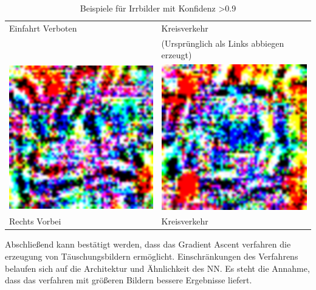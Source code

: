 \begin{table}
\begin{tabular}{p{4.4cm}p{4.4cm}}
	Einfahrt Verboten & Kreisverkehr \\
	& (Ursprünglich als Links abbiegen erzeugt)\\
	\includegraphics[width=\linewidth]{Images/AnPe/39_RechtsVorbeiOrigLinksvorbei} &\includegraphics[width=\linewidth]{Images/AnPe/40_kreisverkehr}  \\
	Rechts Vorbei& Kreisverkehr\\
\end{tabular}

\caption{Beispiele für Irrbilder mit Konfidenz >0.9}
\label{tab:gasc1}
\end{table}

Abschließend kann bestätigt werden, dass das Gradient Ascent verfahren die erzeugung von Täuschungsbildern ermöglicht. Einschränkungen des Verfahrens belaufen sich auf die Architektur und Ähnlichkeit des NN. Es steht die Annahme, dass das verfahren mit größeren Bildern bessere Ergebnisse liefert.